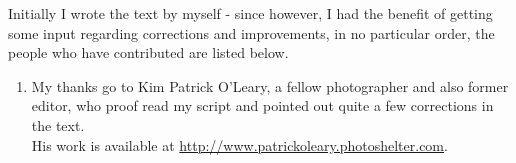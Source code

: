 Initially I wrote the text by myself - since however, I had the benefit of getting some input regarding corrections and improvements, in no particular order, the people who have contributed are listed below.

\begin{enumerate}[-]
	\item My thanks go to Kim Patrick O'Leary, a fellow photographer and also former editor, who proof read my script and pointed out quite a few corrections in the text. \\
His work is available at \url{http://www.patrickoleary.photoshelter.com}.
\end{enumerate}
